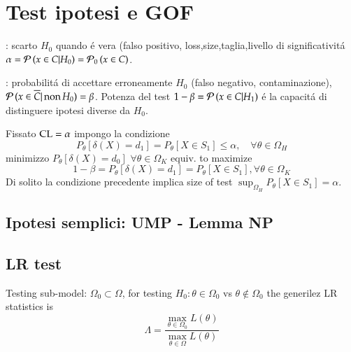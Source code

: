 \documentclass[main.tex]{subfiles}
\begin{document}
\chapter{Test ipotesi e GOF}

: scarto $H_0$ quando \'e vera (falso positivo, loss,size,taglia,livello di significativit\'a $\alpha=\operatorname{\mathcal{P}}{(x\in C|H_0)}=\operatorname{\mathcal{P}}_0{(x\in C)}$.

: probabilit\'a di accettare erroneamente $H_0$ (falso negativo, contaminazione), $\operatorname{\mathcal{P}}{(x\in\overline{C}|\operatorname{non}{H_0})}=\beta$. Potenza del test $1-\beta=\operatorname{\mathcal{P}}{(x\in C|H_1)}$ \'e la capacit\'a di distinguere ipotesi diverse da $H_0$.

Fissato $\operatorname{CL}=\alpha$ impongo la condizione \[P_{\theta}[\delta(X)=d_1]=P_{\theta}[X\in S_1]\leq\alpha,\quad \forall\theta\in\Omega_H\]
minimizzo $P_{\theta}[\delta(X)=d_0]$ $\forall\theta\in\Omega_K$ equiv. to maximize
\[1-\beta=P_{\theta}[\delta(X)=d_1]=P_{\theta}[X\in S_1], \forall\theta\in\Omega_K\]
Di solito la condizione precedente implica size of test $\sup_{\Omega_H}{P_{\theta}[X\in S_1]}=\alpha$.

\section{Ipotesi semplici: UMP - Lemma NP}

\section{LR test}

Testing sub-model: $\Omega_0\subset\Omega$, for testing $H_0: \theta\in\Omega_0$ vs $\theta\notin\Omega_0$ the generilez LR statistics is
\[\Lambda=\frac{\max_{\theta\in\Omega_0}L(\theta)}{\max_{\theta\in\Omega}L(\theta)}\]
\end{document}

